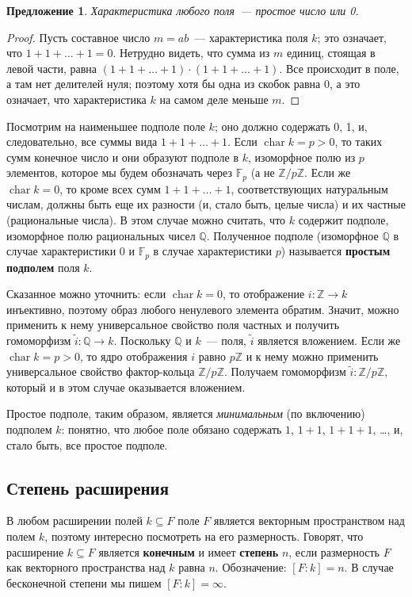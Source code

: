 \documentclass[a4paper,11pt]{scrartcl}
\theoremstyle{plain}
\newtheorem{proposition}[theorem]{Предложение}
\theoremstyle{definition}
\newcommand\dfn[1]{\textbf{#1}}
\newcommand\mb{\mathbb}
\newcommand\wt{\widetilde}
\newcommand\sseq{\subseteq}
\newcommand\cchar{\operatorname{char}}
\begin{document}
\begin{proposition}
Характеристика любого поля~--- простое число или 0.
\end{proposition}
\begin{proof}
Пусть составное число $m=ab$~--- характеристика поля $k$; это
означает, что
$1+1+\dots+1=0$. Нетрудно видеть, что сумма из $m$ единиц, стоящая в
левой части, равна $(1+1+\dots+1)\cdot(1+1+\dots+1)$. Все происходит в
поле, а там нет делителей нуля; поэтому хотя бы одна из скобок равна
0, а это означает, что характеристика $k$ на самом деле меньше $m$.
\end{proof}

Посмотрим на наименьшее подполе поле $k$; оно должно содержать 0, 1,
и, следовательно, все суммы вида $1+1+\dots+1$. Если $\cchar k=p>0$,
то таких сумм конечное число и они образуют подполе в $k$, изоморфное
полю из $p$ элементов, которое мы будем обозначать через $\mb F_p$ (а
не $\mb Z/p\mb Z$. Если же $\cchar k=0$, то кроме всех сумм
$1+1+\dots+1$, соответствующих натуральным числам, должны быть еще их
разности (и, стало быть, целые числа) и их частные (рациональные
числа). В этом случае можно считать, что $k$ содержит подполе,
изоморфное полю рациональных чисел $\mb Q$. Полученное подполе
(изоморфное $\mb Q$ в случае характеристики 0 и $\mb F_p$ в случае
характеристики $p$) называется \dfn{простым подполем} поля $k$.

Сказанное можно уточнить: если $\cchar k=0$, то отображение
$i\colon\mathbb Z\to k$ инъективно, поэтому образ любого ненулевого
элемента
обратим. Значит, можно применить к нему универсальное свойство поля
частных и
получить гомоморфизм $\wt{i}\colon\mb Q\to k$. Поскольку $\mb Q$ и
$k$~--- поля, $\wt{i}$ является вложением. Если же $\cchar k=p>0$, то
ядро отображения $i$ равно $p\mb Z$ и к нему можно применить
универсальное свойство фактор-кольца $\mb Z/p\mb Z$. Получаем
гомоморфизм $\wt{i}\colon\mb Z/p\mb Z$, который и в этом случае
оказывается вложением.

Простое подполе, таким образом, является \emph{минимальным} (по
включению) подполем $k$: понятно, что любое поле обязано содержать
$1$, $1+1$, $1+1+1$, \dots, и, стало быть, все простое подполе.

\subsection{Степень расширения}

В любом расширении полей $k\sseq F$ поле $F$ является векторным
пространством над полем $k$, поэтому интересно посмотреть на его
размерность. Говорят, что расширение $k\sseq F$ является
\dfn{конечным} и имеет \dfn{степень} $n$, если размерность $F$ как
векторного пространства над $k$ равна $n$. Обозначение: $[F:k]=n$. В
случае бесконечной степени мы пишем $[F:k]=\infty$.
\end{document}
